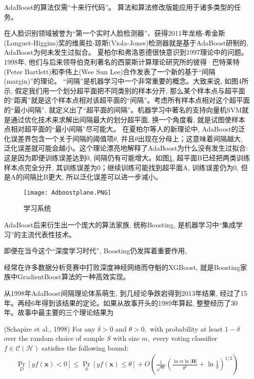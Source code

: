 AdaBoost的算法仅需“十来行代码”。 算法和算法修改版能应用于诸多类型的任务。
\begin{example}
在人脸识别领域被誉为“第一个实时人脸检测器”、获得2011年龙格-希金斯(Longuet-Higgins)奖的维奥拉-琼斯(Viola-Jones)检测器就是基于AdaBoost研制的, AdaBoost为何未发生过拟合。
夏柏尔和弗洛恩德很快意识到1997理论中的问题。1998年, 他们与后来领导伯克利著名的西蒙斯计算理论研究所的彼得·巴特莱特(Peter Bartlett)和李伟上(Wee Sun Lee)合作发表了一个新的基于“间隔(margin)”的理论。
“间隔”是机器学习中一个非常重要的概念。大致来说, 如图4所示, 假定我们用一个划分超平面把不同类别的样本分开, 那么某个样本点与超平面的“距离”就是这个样本点相对该超平面的“间隔”。考虑所有样本点相对这个超平面的“最小间隔”, 就定义出了“超平面的间隔”。机器学习中著名的支持向量机SVM就是通过优化技术来求解出间隔最大的划分超平面, 换一个角度看, 就是试图使样本点相对超平面的“最小间隔”尽可能大。
在夏柏尔等人的新理论中, AdaBoost的泛化误差界包含一个关于间隔的阈值项$\theta$, 并且$\theta$出现在分母上；这意味着间隔越大, 泛化误差就可能会越小。这个理论漂亮地解释了AdaBoost为什么没有发生过拟合:
这是因为即便训练误差达到0, 间隔仍有可能增大。如图\ref{AI32Adboostplane}, 超平面B已经把两类训练样本点完全分开, 其训练误差为0；继续训练可能找到超平面A, 训练误差仍为0, 但是A的间隔比B更大, 所以泛化误差可以进一步减小。
\begin{figure}[H]
    \begin{center}
    \texttt{[image: Adboostplane.PNG]}
    \end{center}
    \caption{学习系统}
    \label{AI32Adboostplane}
\end{figure}

AdaBoost后来衍生出一个庞大的算法家族, 统称Boosting, 是机器学习中“集成学习”的主流代表性技术。  
\end{example}
即便在当今这个“深度学习时代”, Boosting仍发挥着重要作用,
\begin{example}
    经常在许多数据分析竞赛中打败深度神经网络而夺魁的XGBoost, 就是Boosting家族中GradientBoost算法的一种高效实现。
\end{example}

从1998年AdaBoost间隔理论体系萌生, 到几经论争跌宕得到2013年结果, 经过了15年。再经6年得到该结果的定论。如果从故事开头的1989年算起, 整整经历了30年。故事中最主要的三个理论结果为
\begin{mythm}{(Schapire et al., 1998)}{}\label{AIthm7.1}
For any $\delta>0$ and $\theta>0,$ with probability at least $1-\delta$ over the random choice of sample $S$ with size $m,$ every voting classifier $f \in \mathcal{C}(\mathcal{H})$ satisfies the following bound:
\begin{align}
    \operatorname{Pr}_{D}[y f(\boldsymbol{x})<0] \leq \operatorname{Pr}_{S}[y f(\boldsymbol{x}) \leq \theta]+O\left(\frac{1}{\sqrt{m}}\left(\frac{\ln m \ln |\boldsymbol{H}|}{\theta^{2}}+\ln \frac{1}{\delta}\right)^{1 / 2}\right)
\end{align}
\end{mythm}



